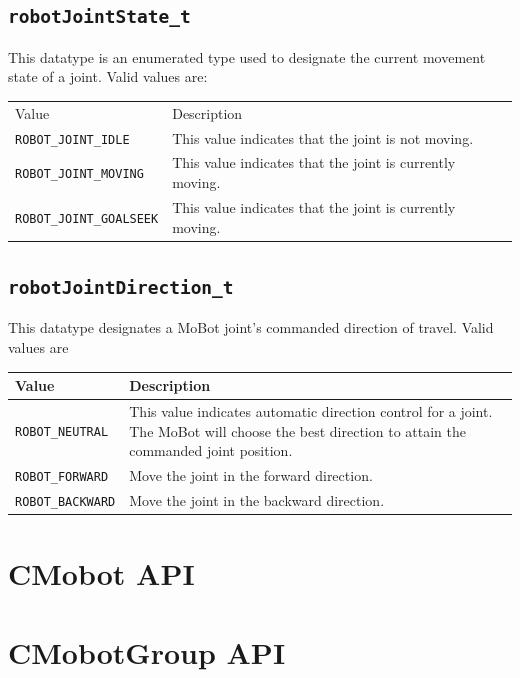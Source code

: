 \documentclass{article}
\begin{document}
\subsection{\label{sec:robotJointState_t}\texttt{robotJointState\_t}}
This datatype is an enumerated type used to designate the current 
movement state of a joint. Valid values are:


\begin{tabular}{p{3.3cm}p{10cm}} \hline 
Value & Description \\
\texttt{ROBOT\_JOINT\_IDLE}& This value indicates that the joint is not moving. \\
\texttt{ROBOT\_JOINT\_MOVING}& This value indicates that the joint is currently moving. \\
\texttt{ROBOT\_JOINT\_GOALSEEK}& This value indicates that the joint is currently moving. \\
\hline
\end{tabular}

\subsection{\label{sec:robotJointDirection_t}\texttt{robotJointDirection\_t}}
This datatype designates a MoBot joint's commanded direction of travel. Valid values
are

\begin{tabular}{p{3cm}p{10cm}} \hline 
Value & Description \\
\hline 
\texttt{ROBOT\_NEUTRAL} & This value indicates automatic direction control for a joint. 
The MoBot will choose the best direction to attain the commanded joint position. \\
\texttt{ROBOT\_FORWARD} & Move the joint in the forward direction. \\
\texttt{ROBOT\_BACKWARD} & Move the joint in the backward direction. \\
\hline
\end{tabular}

\section{CMobot API}


\section{CMobotGroup API}

\printindex
\end{document}
